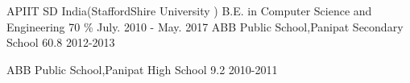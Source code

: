 

\begin{cventries}

  \cventry
    {APIIT SD India(StaffordShire University )} %
    {B.E. in Computer Science and Engineering} %
    {70 \%  } %
    {July. 2010 -  May. 2017} %
    {    }
  \cventry
    {ABB Public School,Panipat} %
    {Secondary School} %
    {60.8} %
    {2012-2013} %
    {    }
    
  \cventry
    {ABB Public School,Panipat} %
    {High School} %
    {9.2} %
    {2010-2011} %
    {    }
\end{cventries}
